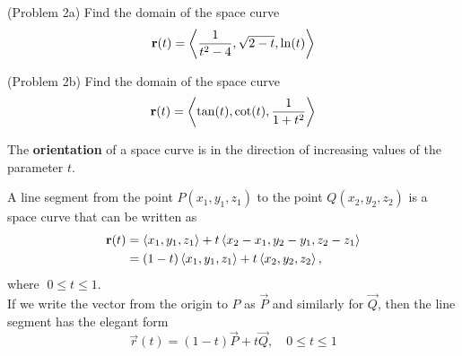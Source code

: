\documentclass[handout]{ximera}
\begin{document}
\begin{problem}(Problem 2a)
Find the domain of the space curve
\[
\mathbf r(t) = \left\langle \frac{1}{t^2 - 4}, \sqrt{2- t}, \ln (t)\right\rangle
\]
\end{problem}

\begin{problem}(Problem 2b)
Find the domain of the space curve
\[
\mathbf r(t) = \left\langle \tan(t), \cot(t), \frac{1}{1+t^2}\right\rangle
\]
\end{problem}


The \textbf{orientation} of a space curve is in the direction of increasing values of the parameter $t$.



A line segment from the point $P(x_1, y_1, z_1)$ to the point $Q(x_2, y_2, z_2)$ is a space curve that can be written as
\begin{align*}
\mathbf r(t) &= \left\langle x_1, y_1, z_1\right\rangle + t\left\langle x_2-x_1, y_2-y_1, z_2-z_1\right\rangle \\
          &= (1-t)\left\langle x_1, y_1, z_1\right\rangle + t\left\langle x_2, y_2, z_2\right\rangle, 
\end{align*}
where $\; 0 \leq t \leq 1$.\\
If we write the vector from the origin to $P$ as $\vec P$ and similarly for $\vec Q$, then the line segment has the elegant form 
\[
\vec r(t) = (1-t) \vec P + t \vec Q, \quad 0 \leq t \leq 1
\]
\begin{image}
\end{image}
\end{document}
